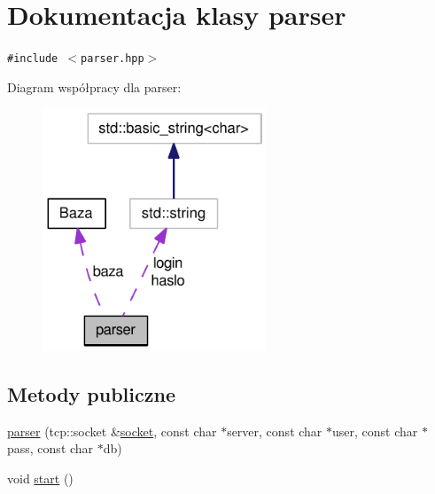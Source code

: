 \hypertarget{a00005}{
\section{Dokumentacja klasy parser}
\label{dd/dad/a00005}
}
{\tt \#include $<$parser.hpp$>$}

Diagram współpracy dla parser:\nopagebreak
\begin{figure}[H]
\begin{center}
\leavevmode
\includegraphics[width=189pt]{d9/d73/a00060}
\end{center}
\end{figure}
\subsection*{Metody publiczne}
\begin{CompactItemize}
\item 
\hyperlink{a00005_9f881c43df7d37da2d6dee1e89ee5f1f}{parser} (tcp::socket \&\hyperlink{a00005_835f5d6b548278a3e00d2c423336e903}{socket}, const char $\ast$server, const char $\ast$user, const char $\ast$pass, const char $\ast$db)
\item 
void \hyperlink{a00005_7793913f528921aa22c4b6cc259a0a14}{start} ()
\end{CompactItemize}
